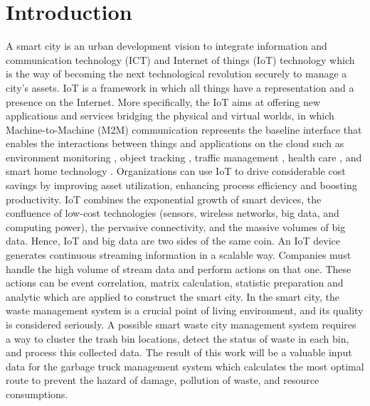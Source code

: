 \documentclass[conference]{IEEEtran}
\begin{document}
\section{Introduction}
\label{section1}
A smart city is an urban development vision to integrate information and communication technology (ICT) and Internet of things (IoT) technology which is the way of becoming the next technological revolution \cite{Delicato2013} securely to manage a city's assets. IoT is a framework in which all things have a representation and a presence on the Internet. More specifically, the IoT aims at offering new applications and services bridging the physical and virtual worlds, in which Machine-to-Machine (M2M) communication represents the baseline interface that enables the interactions between things and applications on the cloud such as environment monitoring \cite{Lazarescu2013}\cite{Kelly2013}, object tracking \cite{Gama2012}, traffic management \cite{Foschini2011}, health care \cite{Jara2011}, and smart home technology \cite{Tozlu2012}\cite{Li2011}. Organizations can use IoT to drive considerable cost savings by improving asset utilization, enhancing process efficiency and boosting productivity. IoT combines the exponential growth of smart devices,  the confluence of low-cost technologies (sensors, wireless networks, big data, and computing power), the pervasive connectivity, and the massive volumes of big data. Hence, IoT and big data are two sides of the same coin. An IoT device generates continuous streaming information in a scalable way. Companies must handle the high volume of stream data and perform actions on that one. These actions can be event correlation, matrix calculation, statistic preparation and analytic which are applied to construct the smart city. In the smart city, the waste management system is a crucial point of living environment, and its quality is considered seriously. A possible smart waste city management system requires a way to cluster the trash bin locations, detect the status of waste in each bin, and process this collected data. The result of this work will be a valuable input data for the garbage truck management system which calculates the most optimal route to prevent the hazard of damage, pollution of waste, and resource consumptions. 
\end{document}
